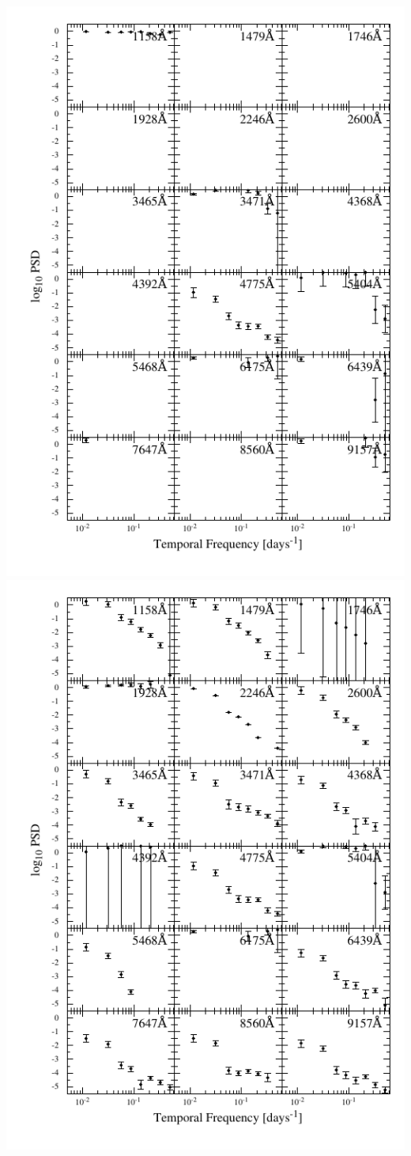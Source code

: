 \documentclass[11pt,letterpaper]{article}
\begin{document}
\includegraphics{../img/psd_atlas_err1.pdf}
\includegraphics{../img/psd_atlas_err2.pdf}
\end{document}
